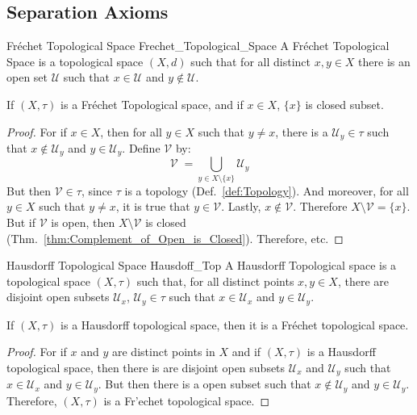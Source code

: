     \subsection{Separation Axioms}
    \begin{ldefinition}{Fr\'{e}chet Topological Space}
                       {Frechet_Topological_Space}
        A Fr\'{e}chet Topological Space is a topological space $(X,d)$ such that
        for all distinct $x,y\in{X}$ there is an open set $\mathcal{U}$ such
        that $x\in\mathcal{U}$ and $y\notin\mathcal{U}$.
    \end{ldefinition}
    \begin{theorem}
        If $(X,\tau)$ is a Fr\'{e}chet Topological space, and if $x\in{X}$,
        $\{x\}$ is closed subset.
    \end{theorem}
    \begin{proof}
        For if $x\in{X}$, then for all $y\in{X}$ such that $y\ne{x}$, there is
        a $\mathcal{U}_{y}\in\tau$ such that $x\notin\mathcal{U}_{y}$ and
        $y\in\mathcal{U}_{y}$. Define $\mathcal{V}$ by:
        \begin{equation}
            \mathcal{V}\;=\bigcup_{y\in{X}\setminus\{x\}}\mathcal{U}_{y}
        \end{equation}
        But then $\mathcal{V}\in\tau$, since $\tau$ is a topology
        (Def.~\ref{def:Topology}). And moreover, for all $y\in{X}$ such that
        $y\ne{x}$, it is true that $y\in\mathcal{V}$. Lastly,
        $x\notin\mathcal{V}$. Therefore $X\setminus\mathcal{V}=\{x\}$. But if
        $\mathcal{V}$ is open, then $X\setminus\mathcal{V}$ is closed
        (Thm.~\ref{thm:Complement_of_Open_is_Closed}). Therefore, etc.
    \end{proof}
    \begin{ldefinition}{Hausdorff Topological Space}
          {Hausdoff_Top}
        A Hausdorff Topological space is a topological space
        $(X,\tau)$ such that, for all distinct points
        $x,y\in{X}$, there are disjoint open subsets
        $\mathcal{U}_{x}$, $\mathcal{U}_{y}\in\tau$ such that
        $x\in\mathcal{U}_{x}$ and $y\in\mathcal{U}_{y}$.
    \end{ldefinition}
    \begin{theorem}
        If $(X,\tau)$ is a Hausdorff topological space, then
        it is a Fr\'{e}chet topological space.
    \end{theorem}
    \begin{proof}
        For if $x$ and $y$ are distinct points in $X$ and if
        $(X,\tau)$ is a Hausdorff topological space, then there
        is are disjoint open subsets $\mathcal{U}_{x}$ and
        $\mathcal{U}_{y}$ such that $x\in\mathcal{U}_{x}$ and
        $y\in\mathcal{U}_{y}$. But then there is a open subset
        such that $x\notin\mathcal{U}_{y}$ and
        $y\in\mathcal{U}_{y}$. Therefore, $(X,\tau)$ is a
        Fr'{e}chet topological space.
    \end{proof}
